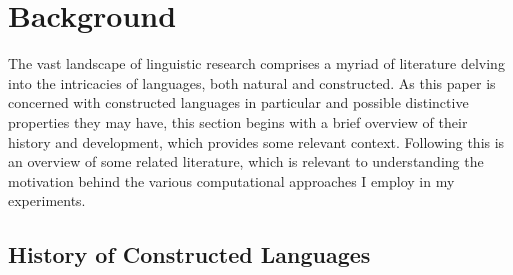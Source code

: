 \documentclass[12pt,a4paper]{article}
\numberwithin{figure}{section}
\numberwithin{table}{section}
\numberwithin{definition}{section}
\begin{document}
\newpage
\section{Background}
\label{sec:background}

The vast landscape of linguistic research comprises a myriad of literature delving into the intricacies of languages, both natural and constructed. As this paper is concerned with constructed languages in particular and possible distinctive properties they may have, this section begins with a brief overview of their history and development, which provides some relevant context. Following this is an overview of some related literature, which is relevant to understanding the motivation behind the various computational approaches I employ in my experiments. 

\subsection{History of Constructed Languages}
\label{ssec:historyofconlangs}
\end{document}
